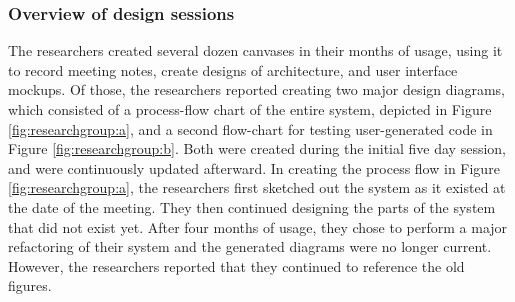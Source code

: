 \documentclass[12pt,fleqn]{ucithesis}
\providecommand{\DIFaddtex}[1]{{\protect\color{blue}\uwave{#1}}} %
\providecommand{\DIFaddbegin}{} %
\providecommand{\DIFaddend}{} %
\providecommand{\DIFadd}[1]{\texorpdfstring{\DIFaddtex{#1}}{#1}} %
\begin{document}
\subsubsection{Overview of design sessions}

The researchers created several dozen canvases in their months of usage, using it to record meeting notes, create designs of \DIFaddbegin \DIFadd{a software }\DIFaddend architecture, and \DIFaddbegin \DIFadd{draws }\DIFaddend user interface mockups. Of those, the researchers reported creating two major design diagrams, which consisted of a process-flow chart of the entire system, depicted in Figure \ref{fig:researchgroup:a}, and a second flow-chart for testing user-generated code in Figure \ref{fig:researchgroup:b}. Both were created during the initial five day session, and were continuously updated afterward. In creating the process flow in Figure \ref{fig:researchgroup:a}, the researchers first sketched out the system as it existed at the date of the meeting. They then continued designing the parts of the system that did not exist yet. After four months of usage, they chose to perform a major refactoring of their system and the generated diagrams were no longer current. However, the researchers reported that they continued to reference the old figures.


%
%
%
\end{document}
